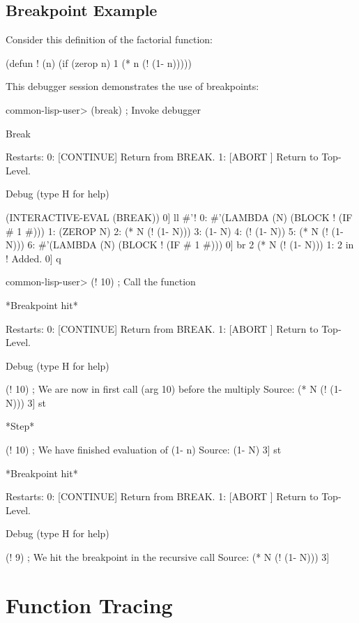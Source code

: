\subsection{Breakpoint Example}

Consider this definition of the factorial function:

\begin{lisp}
(defun ! (n)
  (if (zerop n)
      1
      (* n (! (1- n)))))
\end{lisp}

This debugger session demonstrates the use of breakpoints:

\begin{example}
common-lisp-user> (break) ; Invoke debugger

Break

Restarts:
  0: [CONTINUE] Return from BREAK.
  1: [ABORT   ] Return to Top-Level.

Debug  (type H for help)

(INTERACTIVE-EVAL (BREAK))
0] ll #'!
0: #'(LAMBDA (N) (BLOCK ! (IF # 1 #)))
1: (ZEROP N)
2: (* N (! (1- N)))
3: (1- N)
4: (! (1- N))
5: (* N (! (1- N)))
6: #'(LAMBDA (N) (BLOCK ! (IF # 1 #)))
0] br 2
(* N (! (1- N)))
1: 2 in !
Added.
0] q

common-lisp-user> (! 10) ; Call the function

*Breakpoint hit*

Restarts:
  0: [CONTINUE] Return from BREAK.
  1: [ABORT   ] Return to Top-Level.

Debug  (type H for help)

(! 10) ; We are now in first call (arg 10) before the multiply
Source: (* N (! (1- N)))
3] st

*Step*

(! 10) ; We have finished evaluation of (1- n)
Source: (1- N)
3] st

*Breakpoint hit*

Restarts:
  0: [CONTINUE] Return from BREAK.
  1: [ABORT   ] Return to Top-Level.

Debug  (type H for help)

(! 9) ; We hit the breakpoint in the recursive call
Source: (* N (! (1- N)))
3] 
\end{example}


\section{Function Tracing}

